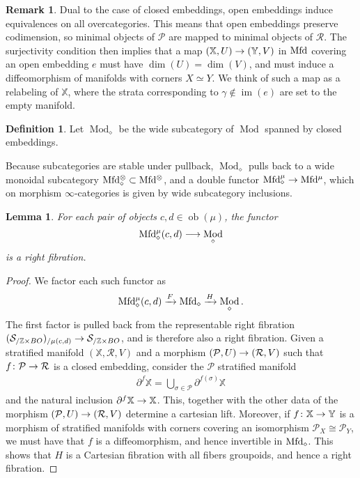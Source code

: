 \documentclass[10pt]{amsart}
\numberwithin{equation}{section}
\newtheorem{lem}[prop]{Lemma}
\theoremstyle{definition}
\newtheorem{definition}[prop]{Definition}
\newtheorem{rem}[prop]{Remark}
\DeclareMathOperator{\im}{im}
\DeclareMathOperator{\Mod}{Mod}
\DeclareMathOperator{\ob}{ob}
\newcommand{\Mfd}{\mathrm{Mfd}\vphantom{d}}
\newcommand{\bZ}{\mathbb{Z}}
\newcommand{\bX}{\mathbb{X}}
\newcommand{\bY}{\mathbb{Y}}
\newcommand{\cP}{\mathcal{P}}
\newcommand{\cS}{\mathcal{S}}
\newcommand{\cR}{\mathcal{R}}
\newcommand{\del}{\partial}
\renewcommand{\to}{\mathchoice{\longrightarrow}{\rightarrow}{}{}}
\begin{document}
\begin{rem} \label{rem:open_embedding}
	Dual to the case of closed embeddings, open embeddings induce equivalences on all overcategories. This means that open embeddings preserve codimension, so minimal objects of $\cP$ are mapped to minimal objects of $\cR$.
	The surjectivity condition then implies that a map $(\bX,U) \to (\bY, V)$ in $\Mfd$ covering an open embedding $e$ must have $\dim(U)=\dim(V)$, and must induce a diffeomorphism of manifolds with corners $X\simeq Y$.
	We think of such a map as a relabeling of $\bX$, where the strata corresponding to $\gamma\notin \im(e)$ are set to the empty manifold.
\end{rem}

\begin{definition}\label{def:Mfd_subcategories}
	Let $\Mod_{\diamond}$ be the wide subcategory of $\Mod$ spanned by closed embeddings.
\end{definition}

Because subcategories are stable under pullback, $\Mod_{\diamond}$ pulls back to a wide monoidal subcategory $\Mfd^{\otimes}_{\diamond} \subset \Mfd^{\otimes}$, and a double functor $\Mfd_{\diamond}^{\mu}\to \Mfd^{\mu}$, which on morphism $\infty$-categories is given by wide subcategory inclusions.

\begin{lem}\label{lem:fiberwise_right_fib}
	For each pair of objects $c,d \in \ob(\mu)$, the functor
	\begin{align*}
		\Mfd_{\diamond}^{\mu}(c,d) \to \Mod_{\diamond}
	\end{align*}
	is a right fibration.
\end{lem}

\begin{proof}
	We factor each such functor as
	\begin{align*}
		\Mfd_{\diamond}^{\mu}(c,d) \xrightarrow{F} \Mfd_{\diamond} \xrightarrow{H} \Mod_{\diamond}.
	\end{align*}
	The first factor is pulled back from the representable right fibration $(\cS_{/\bZ\times BO})_{/\mu(c,d)} \to \cS_{/\bZ\times BO}$, and is therefore also a right fibration.
  Given a stratified manifold $(\bX, \cR, V)$ and a morphism $(\cP,U)\to (\cR,V)$ such that $f\colon \cP \to \cR$ is a closed embedding, consider the $\cP$ stratified manifold
	\begin{align*}
		\del^{f} \bX = \bigcup_{\sigma \in \cP} \del^{f(\sigma)} \bX
	\end{align*}
	and the natural inclusion $\del^{f}\bX \to \bX$. This, together with the other data of the morphism $(\cP,U) \to (\cR, V)$ determine a cartesian lift. Moreover, if $f\colon \bX \to \bY$ is a morphism of stratified manifolds with corners covering an isomorphism $\cP_{X} \cong \cP_{Y}$, we must have that $f$ is a diffeomorphism, and hence invertible in $\Mfd_{\diamond}$.
	This shows that $H$ is a Cartesian fibration with all fibers groupoids, and hence a right fibration.
\end{proof}
\end{document}
